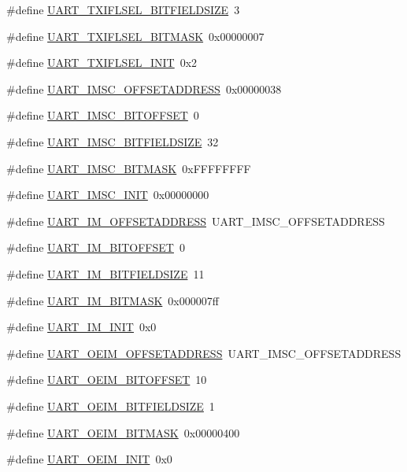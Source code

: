\begin{DoxyCompactItemize}
\item 
\#define \hyperlink{a00575_a145513882c6159df59c43b4c439c1891}{UART\_\-TXIFLSEL\_\-BITFIELDSIZE}~3
\item 
\#define \hyperlink{a00575_a368849c4bf3824ac54f61053136753b9}{UART\_\-TXIFLSEL\_\-BITMASK}~0x00000007
\item 
\#define \hyperlink{a00575_a6bee2c6e9a0645d4b94bff23154cedc3}{UART\_\-TXIFLSEL\_\-INIT}~0x2
\item 
\#define \hyperlink{a00575_a5a553c323e73adbb6112be8632b5066b}{UART\_\-IMSC\_\-OFFSETADDRESS}~0x00000038
\item 
\#define \hyperlink{a00575_ace84ef5c40fa4c197a5a96e72157df0c}{UART\_\-IMSC\_\-BITOFFSET}~0
\item 
\#define \hyperlink{a00575_a399a85ea2a452d7780c8324d9245a7e7}{UART\_\-IMSC\_\-BITFIELDSIZE}~32
\item 
\#define \hyperlink{a00575_ae975026a789b3e5831b9ca0243bab4d8}{UART\_\-IMSC\_\-BITMASK}~0xFFFFFFFF
\item 
\#define \hyperlink{a00575_a35c0c386692be930a90c40845d45ddf5}{UART\_\-IMSC\_\-INIT}~0x00000000
\item 
\#define \hyperlink{a00575_a585c72a276d29520208196a93d385960}{UART\_\-IM\_\-OFFSETADDRESS}~UART\_\-IMSC\_\-OFFSETADDRESS
\item 
\#define \hyperlink{a00575_ae44c8152da0a8c82b602253fb3c04ab9}{UART\_\-IM\_\-BITOFFSET}~0
\item 
\#define \hyperlink{a00575_a8155ddbfbb9ee15cf4ca622dd1549d63}{UART\_\-IM\_\-BITFIELDSIZE}~11
\item 
\#define \hyperlink{a00575_a1fe7f0b70bc5cc610072182dafcc6dac}{UART\_\-IM\_\-BITMASK}~0x000007ff
\item 
\#define \hyperlink{a00575_a514c92778c433cb96b10e7b4f150bf8b}{UART\_\-IM\_\-INIT}~0x0
\item 
\#define \hyperlink{a00575_abd191022583aff98a76916083d18f99b}{UART\_\-OEIM\_\-OFFSETADDRESS}~UART\_\-IMSC\_\-OFFSETADDRESS
\item 
\#define \hyperlink{a00575_aa9110947398d4d24966ab05c3757cc15}{UART\_\-OEIM\_\-BITOFFSET}~10
\item 
\#define \hyperlink{a00575_a08e4f18d9d88beb76052ef296bedb377}{UART\_\-OEIM\_\-BITFIELDSIZE}~1
\item 
\#define \hyperlink{a00575_ae63c7ba3ecc425f52e2b196dfcebd7f5}{UART\_\-OEIM\_\-BITMASK}~0x00000400
\item 
\#define \hyperlink{a00575_af6ad451565a7f056396b8437a0c54279}{UART\_\-OEIM\_\-INIT}~0x0

\end{DoxyCompactItemize}
